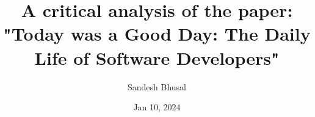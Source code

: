 \documentclass{article}
\title{A critical analysis of the paper: "Today was a Good Day:
The Daily Life of Software Developers"}
\author{Sandesh Bhusal}
\date{Jan 10, 2024}
\begin{document}
    \maketitle{}

\end{document}

